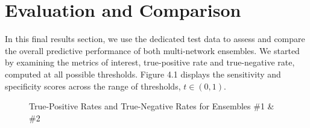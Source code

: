\documentclass [MAS] {uclathes}
\begin{document}
\section{Evaluation and Comparison}

In this final results section, we use the dedicated test data to assess and compare the overall predictive performance of both
multi-network ensembles. We started by examining the metrics of interest, true-positive rate and true-negative rate, computed at all possible thresholds. Figure 4.1 displays the sensitivity and specificity scores across the range of thresholds, $t \in (0, 1)$.

\begin{figure}[hbt!]
\hspace*{\fill}
\centering
{}\hspace{0em}
\hspace*{\fill}
\label{fig:sens_spec}
\vspace{0cm}
\caption{True-Positive Rates and True-Negative Rates for Ensembles \#1 \& \#2}
\end{figure}
\end{document}
